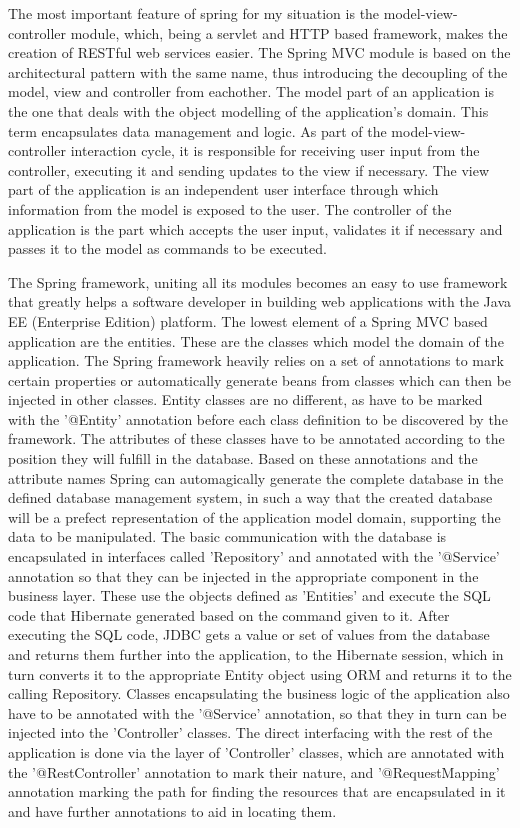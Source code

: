 \documentclass[12pt,a4paper,twoside]{report}
\begin{document}
The most important feature of spring for my situation is the model-view-controller module, which, being a servlet and HTTP based framework, makes the creation of RESTful web services easier. The Spring MVC module is based on the architectural pattern with the same name, thus introducing the decoupling of the model, view and controller from eachother. The model part of an application is the one that deals with the object modelling of the application's domain. This term encapsulates data management and logic. As part of the model-view-controller interaction cycle, it is responsible for receiving user input from the controller, executing it and sending updates to the view if necessary. The view part of the application is an independent user interface through which information from the model is exposed to the user. The controller of the application is the part which accepts the user input, validates it if necessary and passes it to the model as commands to be executed.

The Spring framework, uniting all its modules becomes an easy to use framework that greatly helps a software developer in building web applications with the Java EE (Enterprise Edition) platform. The lowest element of a Spring MVC based application are the entities. These are the classes which model the domain of the application. The Spring framework heavily relies on a set of annotations to mark certain properties or automatically generate beans from classes which can then be injected in other classes. Entity classes are no different, as have to be marked with the '@Entity' annotation before each class definition to be discovered by the framework. The attributes of these classes have to be annotated according to the position they will fulfill in the database. Based on these annotations and the attribute names Spring can automagically generate the complete database in the defined database management system, in such a way that the created database will be a prefect representation of the application model domain, supporting the data to be manipulated. The basic communication with the database is encapsulated in interfaces called 'Repository' and annotated with the '@Service' annotation so that they can be injected in the appropriate component in the business layer. These use the objects defined as 'Entities' and execute the SQL code that Hibernate generated based on the command given to it. After executing the SQL code, JDBC gets a value or set of values from the database and returns them further into the application, to the Hibernate session, which in turn converts it to the appropriate Entity object using ORM and returns it to the calling Repository. Classes encapsulating the business logic of the application also have to be annotated with the '@Service' annotation, so that they in turn can be injected into the 'Controller' classes. The direct interfacing with the rest of the application is done via the layer of 'Controller' classes, which are annotated with the '@RestController' annotation to mark their nature, and '@RequestMapping' annotation marking the path for finding the resources that are encapsulated in it and have further annotations to aid in locating them.
\end{document}
